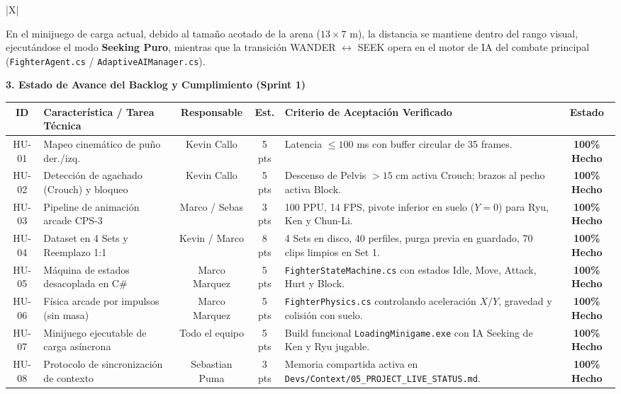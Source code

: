 \documentclass[10pt,a4paper]{article}
\begin{document}
{\begin{tabularx}{\textwidth}{|X|}
{\begin{itemize}[noitemsep,topsep=2pt]
        En el minijuego de carga actual, debido al tamaño acotado de la arena ($13 \times 7$ m), la distancia se mantiene dentro del rango visual, ejecutándose el modo \textbf{Seeking Puro}, mientras que la transición WANDER $\leftrightarrow$ SEEK opera en el motor de IA del combate principal (\texttt{FighterAgent.cs} / \texttt{AdaptiveAIManager.cs}).
    \end{itemize}

    \vspace{0.25cm}
    \raggedright\textbf{\large 3. Estado de Avance del Backlog y Cumplimiento (Sprint 1)}\par\vspace{0.15cm}
    \begin{center}
    \fontsize{7.5pt}{9pt}\selectfont
    \begin{tabular}{|c|p{4.5cm}|c|c|p{5.5cm}|c|}
    \hline
    \rowcolor{gray!20} \textbf{ID} & \textbf{Característica / Tarea Técnica} & \textbf{Responsable} & \textbf{Est.} & \textbf{Criterio de Aceptación Verificado} & \textbf{Estado} \\ \hline
    HU-01 & Mapeo cinemático de puño der./izq. & Kevin Callo & 5 pts & Latencia $\le 100$ ms con buffer circular de 35 frames. & \textbf{100\% Hecho} \\ \hline
    HU-02 & Detección de agachado (Crouch) y bloqueo & Kevin Callo & 5 pts & Descenso de Pelvis $> 15$ cm activa Crouch; brazos al pecho activa Block. & \textbf{100\% Hecho} \\ \hline
    HU-03 & Pipeline de animación arcade CPS-3 & Marco / Sebas & 3 pts & 100 PPU, 14 FPS, pivote inferior en suelo ($Y=0$) para Ryu, Ken y Chun-Li. & \textbf{100\% Hecho} \\ \hline
    HU-04 & Dataset en 4 Sets y Reemplazo 1:1 & Kevin / Marco & 8 pts & 4 Sets en disco, 40 perfiles, purga previa en guardado, 70 clips limpios en Set 1. & \textbf{100\% Hecho} \\ \hline
    HU-05 & Máquina de estados desacoplada en C\# & Marco Marquez & 5 pts & \texttt{FighterStateMachine.cs} con estados Idle, Move, Attack, Hurt y Block. & \textbf{100\% Hecho} \\ \hline
    HU-06 & Física arcade por impulsos (sin masa) & Marco Marquez & 5 pts & \texttt{FighterPhysics.cs} controlando aceleración $X/Y$, gravedad y colisión con suelo. & \textbf{100\% Hecho} \\ \hline
    HU-07 & Minijuego ejecutable de carga asíncrona & Todo el equipo & 5 pts & Build funcional \texttt{LoadingMinigame.exe} con IA Seeking de Ken y Ryu jugable. & \textbf{100\% Hecho} \\ \hline
    HU-08 & Protocolo de sincronización de contexto & Sebastian Puma & 3 pts & Memoria compartida activa en \texttt{Devs/Context/05\_PROJECT\_LIVE\_STATUS.md}. & \textbf{100\% Hecho} \\ \hline
    \end{tabular}
    \end{center}
} \tabularnewline
\hline
\end{tabularx}
}
\end{document}
